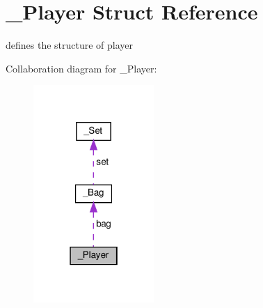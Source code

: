 \hypertarget{struct__Player}{}\section{\+\_\+\+Player Struct Reference}
\label{struct__Player}


defines the structure of player  




Collaboration diagram for \+\_\+\+Player\+:
\nopagebreak
\begin{figure}[H]
\begin{center}
\leavevmode
\includegraphics[width=130pt]{struct__Player__coll__graph}
\end{center}
\end{figure}
